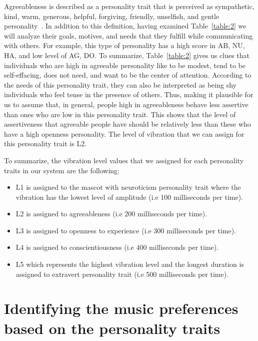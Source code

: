 Agreeableness is described as a personality trait that is perceived as sympathetic,
kind, warm, generous, helpful, forgiving, friendly, unselfish, and gentle personality~\cite{matthews2003personality}.
In addition to this definition, having examined Table~\ref{table:2} we will
analyze their goals, motives, and needs that they fulfill while communicating with others.
For example, this type of personality has a high score in AB, NU, HA, and low level
of AG, DO. To summarize, Table~\ref{table:2} gives us clues that individuals who
are high in agreeable personality like to be modest, tend to be self-effacing,
does not need, and want to be the center of attention.
According to the needs of this personality trait, they can also be interpreted as
being shy individuals who feel tense in the presence of others.
Thus, making it plausible for us to assume that, in general, people high in agreeableness
behave less assertive than ones who are low in this personality trait.
This shows that the level of assertiveness that agreeable people have should be
relatively less than these who have a high openness personality.
The level of vibration that we can assign for this personality trait is L2.


To summarize, the vibration level values that we assigned for each personality traits in our system are the following:
\begin{itemize}
\item L1 is assigned to the mascot with neuroticism personality trait where the
      vibration has the lowest level of amplitude (i.e 100 milliseconds per time).
\item L2 is assigned to agreeableness (i.e 200 milliseconds per time).
\item L3 is assigned to openness to experience (i.e 300 milliseconds per time).
\item L4 is assigned to conscientiousness (i.e 400 milliseconds per time).
\item L5 which represents the highest vibration level and the longest duration
      is assigned to extravert personality trait (i.e 500 milliseconds per time).
\end{itemize}



\section{Identifying the music preferences based on the personality traits}
\label{sec:Identifying the music preferences based on the personality traits}

